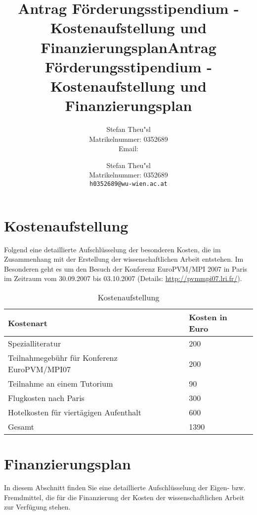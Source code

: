 \documentclass[a4paper,fleqn]{article}
\title{Antrag F\"orderungsstipendium - Kostenaufstellung und Finanzierungsplan}
\author{Stefan Theu"sl\\Matrikelnummer: 0352689\\Email: \email{h0352689@wu-wien.ac.at}}
\def\email#1{{\tt#1}}
\begin{document}
\title{Antrag F\"orderungsstipendium - Kostenaufstellung und
  Finanzierungsplan}

\author{Stefan Theu"sl \\Matrikelnummer: 0352689\\ \email{h0352689@wu-wien.ac.at}}


\maketitle

\section{Kostenaufstellung}

Folgend eine detaillierte Aufschl\"usselung der besonderen Kosten, die
im Zusammenhang mit der Erstellung der wissenschaftlichen Arbeit
entstehen. Im Besonderen geht es um den Besuch der Konferenz
EuroPVM/MPI 2007 in Paris im Zeitraum vom 30.09.2007 bis 03.10.2007
(Details: \url{http://pvmmpi07.lri.fr/}).

\begin{table}[ht]
  \centering
  \caption{Kostenaufstellung}
  \label{table:Kostenaufstellung}
  \begin{tabular}{|l|l|}
    \hline
    Kostenart                              & Kosten in Euro \\
    \hline
    Spezialliteratur                                & 200  \\
    Teilnahmegeb\"uhr f\"ur Konferenz EuroPVM/MPI07 & 200  \\
    Teilnahme an einem Tutorium                     &  90  \\
    Flugkosten nach Paris                           & 300  \\
    Hotelkosten f\"ur viert\"agigen Aufenthalt      & 600  \\
    \hline
    Gesamt                                          &1390  \\  
    \hline
  \end{tabular}
\end{table}


\section{Finanzierungsplan}

In diesem Abschnitt finden Sie eine detaillierte Aufschl\"usselung der
Eigen- bzw. Fremdmittel, die f\"ur die Finanzierung der Kosten der
wissenschaftlichen Arbeit zur Verf\"ugung stehen.
\end{document}
